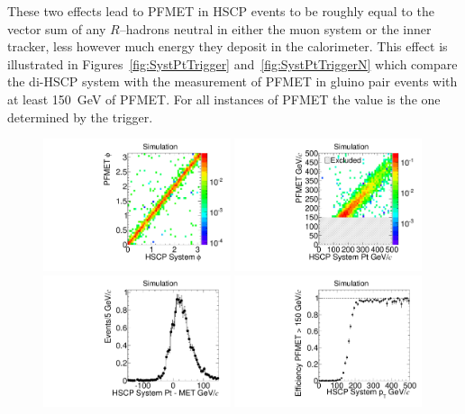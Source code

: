 These two effects lead to PFMET in HSCP events to be roughly equal to the vector sum of any $R$--hadrons neutral in
either the muon system or the inner tracker, less however much energy they deposit in the calorimeter. This effect is illustrated in Figures~\ref{fig:SystPtTrigger} 
and~\ref{fig:SystPtTriggerN} which compare the di-HSCP system with the measurement of PFMET
in gluino pair events with at least 150~GeV of PFMET. For all instances of PFMET the value is the one determined by the trigger.

\begin{figure}
  \begin{center}
      \includegraphics[clip=false, trim=0.0cm 0cm 0.0cm 0cm, width=0.49\textwidth]{figures/search/Gluino_8TeV_M1200_f100SystPhiMET}
      \includegraphics[clip=false, trim=0.0cm 0cm 0.0cm 0cm, width=0.49\textwidth]{figures/search/Gluino_8TeV_M1200_f100SystPtMET} \\
      \includegraphics[clip=false, trim=0.0cm 0cm 0.0cm 0cm, width=0.49\textwidth]{figures/search/Gluino_8TeV_M1200_f100SystPtDiffMET}
      \includegraphics[clip=false, trim=0.0cm 0cm 0.0cm 0cm, width=0.49\textwidth]{figures/search/Gluino_8TeV_M1200_f100SystPtEff}

\end{center}
\end{figure}
